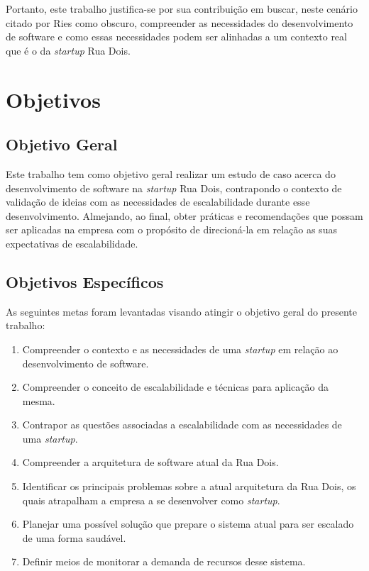 Portanto, este trabalho justifica-se por sua contribuição em buscar, neste
cenário citado por Ries como obscuro, compreender as necessidades do desenvolvimento
de software e como essas necessidades podem ser alinhadas a um contexto real
que é o da \textit{startup} Rua Dois.

\section{Objetivos}

\subsection{Objetivo Geral}

Este trabalho tem como objetivo geral realizar um estudo de caso acerca do
desenvolvimento de software na \textit{startup} Rua Dois, contrapondo o contexto de
validação de ideias com as necessidades de escalabilidade durante esse
desenvolvimento. Almejando, ao final, obter práticas e recomendações que possam
ser aplicadas na empresa com o propósito de direcioná-la em relação as suas
expectativas de escalabilidade.

\subsection{Objetivos Específicos}

As seguintes metas foram levantadas visando atingir o objetivo geral do presente
trabalho:

  \begin{enumerate}
    \item Compreender o contexto e as necessidades de uma \textit{startup} em
    relação ao desenvolvimento de software.
    \item Compreender o conceito de escalabilidade e técnicas para aplicação
    da mesma.
    \item Contrapor as questões associadas a escalabilidade com as necessidades
    de uma \textit{startup}.
    \item Compreender a arquitetura de software atual da Rua Dois.
    \item Identificar os principais problemas sobre a atual arquitetura da Rua
    Dois, os quais atrapalham a empresa a se desenvolver como \textit{startup}.
    \item Planejar uma possível solução que prepare o sistema atual para ser
    escalado de uma forma saudável.
    \item Definir meios de monitorar a demanda de recursos desse sistema.
  \end{enumerate}

